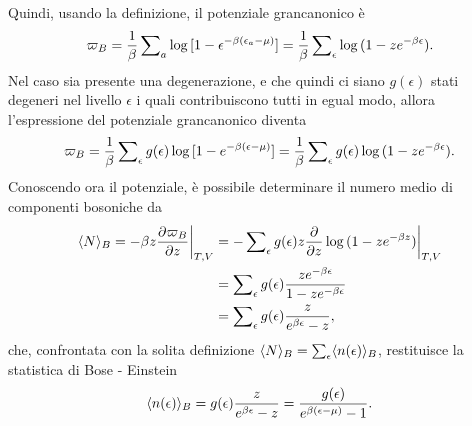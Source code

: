 Quindi, usando la definizione, il potenziale grancanonico è
\begin{equation}
    \varpi_B = \frac{1}{\beta}\sum\nolimits_a\log{[1 - \epsilon^{-\beta(\epsilon_a - \mu)}]} = \frac{1}{\beta}\sum\nolimits_\epsilon\log{(1 - ze^{-\beta\epsilon})}.
\end{equation}
Nel caso sia presente una degenerazione, e che quindi ci siano $g(\epsilon)$ stati degeneri nel livello $\epsilon$ i quali contribuiscono tutti in egual modo, allora l'espressione del potenziale grancanonico diventa
\begin{equation}
    \varpi_B = \frac{1}{\beta}\sum\nolimits_\epsilon g(\epsilon)\log{[1 - e^{-\beta(\epsilon - \mu)}]} = \frac{1}{\beta}\sum\nolimits_\epsilon g(\epsilon)\log{(1 - ze^{-\beta\epsilon})}.
\end{equation}
Conoscendo ora il potenziale, è possibile determinare il numero medio di componenti bosoniche da
\begin{equation}
    \begin{split}
        \langle N \rangle_B = -\beta z \frac{\partial\varpi_B}{\partial z}\bigg|_{T,V} &= -\sum\nolimits_\epsilon g(\epsilon)z\frac{\partial}{\partial z}\log{(1 - ze^{-\beta z})}\bigg|_{T,V} \\
        &= \sum\nolimits_\epsilon g(\epsilon)\frac{ze^{-\beta\epsilon}}{1 - ze^{-\beta\epsilon}} \\
        &= \sum\nolimits_\epsilon g(\epsilon)\frac{z}{e^{\beta\epsilon} - z},
    \end{split}
\end{equation}
che, confrontata con la solita definizione $\langle N \rangle_B = \sum\nolimits_\epsilon \langle n(\epsilon) \rangle_B$, restituisce la statistica di Bose - Einstein
\begin{equation}
\label{eq: statistica Bose-Einstein}
    \langle n(\epsilon) \rangle_B = g(\epsilon)\frac{z}{e^{\beta\epsilon} - z} = \frac{g(\epsilon)}{e^{\beta(\epsilon - \mu)} - 1}.
\end{equation}

